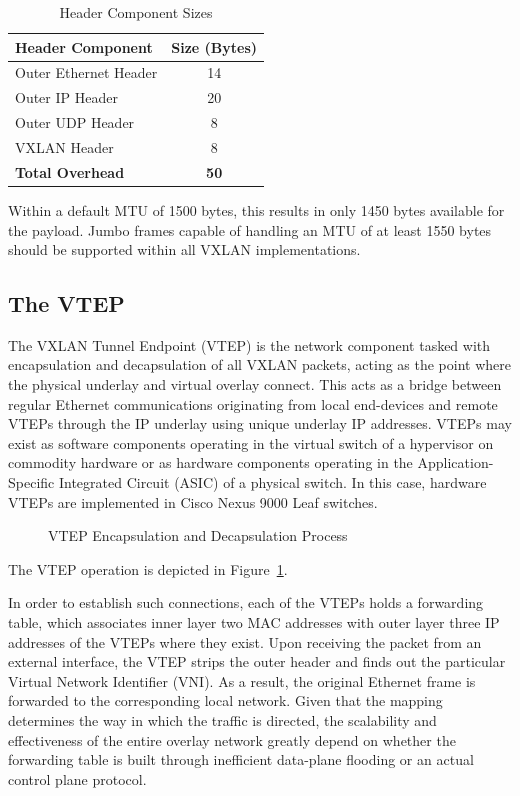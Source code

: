 \begin{table}[!htbp]
\small
\centering
\begin{tabularx}{0.6\textwidth}{@{} X c @{}} %
\toprule
\textbf{Header Component} & \textbf{Size (Bytes)} \\ \midrule
Outer Ethernet Header & 14 \\ \midrule
Outer IP Header       & 20 \\ \midrule
Outer UDP Header      & 8  \\ \midrule
VXLAN Header          & 8  \\ \midrule
\textbf{Total Overhead} & \textbf{50} \\ \bottomrule
\end{tabularx}
\caption{Header Component Sizes}
\label{tab:vxlan-overhead}
\end{table}
Within a default MTU of 1500 bytes, this results in only 1450 bytes available for the payload. Jumbo frames capable of handling an MTU of at least 1550 bytes should be supported within all VXLAN implementations.

\subsection*{The VTEP}
The VXLAN Tunnel Endpoint (VTEP) is the network component tasked with encapsulation and decapsulation of all VXLAN packets, acting as the point where the physical underlay and virtual overlay connect. This acts as a bridge between regular Ethernet communications originating from local end-devices and remote VTEPs through the IP underlay using unique underlay IP addresses. VTEPs may exist as software components operating in the virtual switch of a hypervisor on commodity hardware or as hardware components operating in the Application-Specific Integrated Circuit (ASIC) of a physical switch. In this case, hardware VTEPs are implemented in Cisco Nexus 9000 Leaf switches.

\begin{figure}[!htbp]
    \centering
    \VTEPtraffic
    \caption{VTEP Encapsulation and Decapsulation Process}
    \label{fig:vtep-diagram}
\end{figure}
The VTEP operation is depicted in Figure~\ref{fig:vtep-diagram}.

In order to establish such connections, each of the VTEPs holds a forwarding table, which associates inner layer two MAC addresses with outer layer three IP addresses of the VTEPs where they exist. Upon receiving the packet from an external interface, the VTEP strips the outer header and finds out the particular Virtual Network Identifier (VNI). As a result, the original Ethernet frame is forwarded to the corresponding local network. Given that the mapping determines the way in which the traffic is directed, the scalability and effectiveness of the entire overlay network greatly depend on whether the forwarding table is built through inefficient data-plane flooding or an actual control plane protocol.

